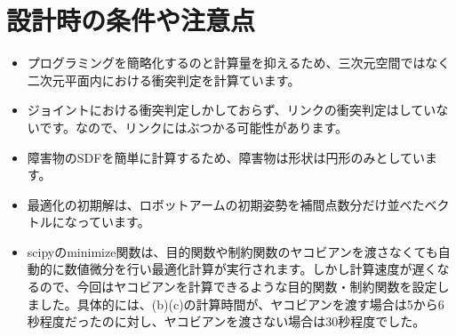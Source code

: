 \section{設計時の条件や注意点}
\begin{itemize}
  \item プログラミングを簡略化するのと計算量を抑えるため、三次元空間ではなく二次元平面内における衝突判定を計算ています。
  \item ジョイントにおける衝突判定しかしておらず、リンクの衝突判定はしていないです。なので、リンクにはぶつかる可能性があります。
  \item 障害物のSDFを簡単に計算するため、障害物は形状は円形のみとしています。
  \item 最適化の初期解は、ロボットアームの初期姿勢を補間点数分だけ並べたベクトルになっています。
  \item scipyのminimize関数は、目的関数や制約関数のヤコビアンを渡さなくても自動的に数値微分を行い最適化計算が実行されます。しかし計算速度が遅くなるので、今回はヤコビアンを計算できるような目的関数・制約関数を設定しました。具体的には、(b)(c)の計算時間が、ヤコビアンを渡す場合は5から6秒程度だったのに対し、ヤコビアンを渡さない場合は30秒程度でした。
\end{itemize}
